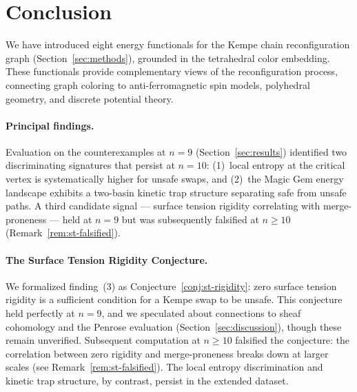 
\section{Conclusion}\label{sec:conclusion}

We have introduced eight energy functionals for the Kempe chain
reconfiguration graph (Section~\ref{sec:methods}), grounded in the
tetrahedral color embedding. These functionals provide complementary
views of the reconfiguration process, connecting graph coloring to
anti-ferromagnetic spin models, polyhedral geometry, and discrete
potential theory.

\paragraph{Principal findings.}
Evaluation on the counterexamples at $n = 9$
(Section~\ref{sec:results}) identified two discriminating signatures
that persist at $n = 10$: (1)~local entropy at the critical vertex is
systematically higher for unsafe swaps, and (2)~the Magic Gem energy
landscape exhibits a two-basin kinetic trap structure separating safe
from unsafe paths. A third candidate signal — surface tension rigidity
correlating with merge-proneness — held at $n = 9$ but was
subsequently falsified at $n \geq 10$
(Remark~\ref{rem:st-falsified}).

\paragraph{The Surface Tension Rigidity Conjecture.}
We formalized finding~(3) as
Conjecture~\ref{conj:st-rigidity}: zero surface tension rigidity is
a sufficient condition for a Kempe swap to be unsafe. This conjecture
held perfectly at $n = 9$, and we speculated about connections to sheaf
cohomology and the Penrose evaluation
(Section~\ref{sec:discussion}), though these remain unverified.
Subsequent computation at $n \geq 10$ falsified the conjecture: the
correlation between zero rigidity and merge-proneness breaks down at
larger scales (see Remark~\ref{rem:st-falsified}). The local entropy
discrimination and kinetic trap structure, by contrast, persist in the
extended dataset.

